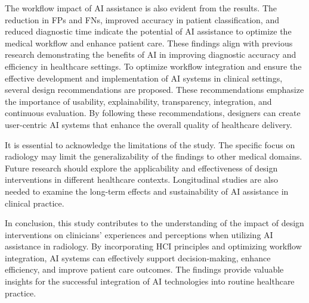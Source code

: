 The workflow impact of \ac{AI} assistance is also evident from the results.
The reduction in \acp{FP} and \acp{FN}, improved accuracy in patient classification, and reduced diagnostic time indicate the potential of \ac{AI} assistance to optimize the medical workflow and enhance patient care.
These findings align with previous research demonstrating the benefits of \ac{AI} in improving diagnostic accuracy and efficiency in healthcare settings.
To optimize workflow integration and ensure the effective development and implementation of \ac{AI} systems in clinical settings, several design recommendations are proposed.
These recommendations emphasize the importance of usability, explainability, transparency, integration, and continuous evaluation.
By following these recommendations, designers can create user-centric \ac{AI} systems that enhance the overall quality of healthcare delivery.

It is essential to acknowledge the limitations of the study.
The specific focus on radiology may limit the generalizability of the findings to other medical domains.
Future research should explore the applicability and effectiveness of design interventions in different healthcare contexts.
Longitudinal studies are also needed to examine the long-term effects and sustainability of \ac{AI} assistance in clinical practice.

In conclusion, this study contributes to the understanding of the impact of design interventions on clinicians' experiences and perceptions when utilizing \ac{AI} assistance in radiology.
By incorporating \ac{HCI} principles and optimizing workflow integration, \ac{AI} systems can effectively support decision-making, enhance efficiency, and improve patient care outcomes.
The findings provide valuable insights for the successful integration of \ac{AI} technologies into routine healthcare practice.